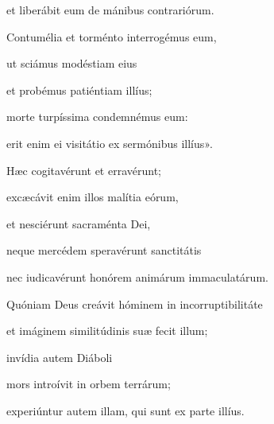 {\noindent et liberábit eum de mánibus contrariórum. 

\noindent Contumélia et torménto interrogémus eum, 

\noindent ut sciámus modéstiam eius 

\noindent et probémus patiéntiam illíus;

\noindent morte turpíssima condemnémus eum: 

\noindent erit enim ei visitátio ex sermónibus illíus».

\noindent Hæc cogitavérunt et erravérunt; 

\noindent excæcávit enim illos malítia eórum, 

\noindent et nesciérunt sacraménta Dei, 

\noindent neque mercédem speravérunt sanctitátis 

\noindent nec iudicavérunt honórem animárum immaculatárum.

\noindent Quóniam Deus creávit hóminem in incorruptibilitáte

\noindent et imáginem similitúdinis suæ fecit illum; 

\noindent invídia autem Diáboli 

\noindent mors introívit in orbem terrárum; 

\noindent experiúntur autem illam, qui sunt ex parte illíus.}
\newcommand{\responsoriumi}{\pars{Responsorium 1.} \scriptura{\Rbardot{} Sap. 2, 12-20 \Vbardot{} ibidem; \textbf{H172}}

\vspace{-5mm}

\responsorium{I}{temporalia/resp-dixeruntimpii.gtex}{}}
